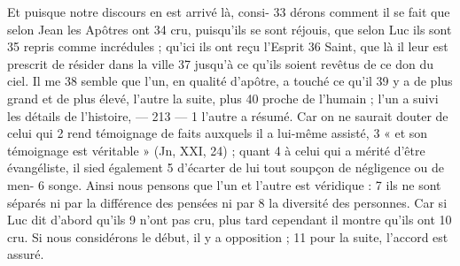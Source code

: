 Et puisque notre discours en est arrivé là, consi-	 
33	 	dérons comment il se fait que selon Jean les Apôtres ont	 
34	 	cru, puisqu'ils se sont réjouis, que selon Luc ils sont	 
35	 	repris comme incrédules ; qu'ici ils ont reçu l'Esprit	 
36	 	Saint, que là il leur est prescrit de résider dans la ville	 
37	 	jusqu'à ce qu'ils soient revêtus de ce don du ciel. Il me	 
38	 	semble que l'un, en qualité d'apôtre, a touché ce qu'il	 
39	 	y a de plus grand et de plus élevé, l'autre la suite, plus	 
40	 	proche de l'humain ; l'un a suivi les détails de l'histoire,	 
 	--- 213 ---	 
1	 	l'autre a résumé. Car on ne saurait douter de celui qui	 
2	 	rend témoignage de faits auxquels il a lui-même assisté,	 
3	 	« et son témoignage est véritable » (Jn, XXI, 24) ; quant	 
4	 	à celui qui a mérité d'être évangéliste, il sied également	 
5	 	d'écarter de lui tout soupçon de négligence ou de men-	 
6	 	songe. Ainsi nous pensons que l'un et l'autre est véridique :	 
7	 	ils ne sont séparés ni par la différence des pensées ni par	 
8	 	la diversité des personnes. Car si Luc dit d'abord qu'ils	 
9	 	n'ont pas cru, plus tard cependant il montre qu'ils ont	 
10	 	cru. Si nous considérons le début, il y a opposition ;	 
11	 	pour la suite, l'accord est assuré.